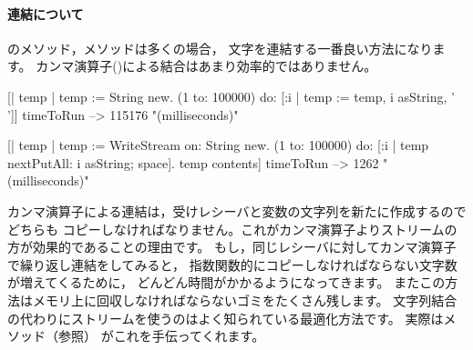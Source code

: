 \documentclass[a4paper,10pt,twoside]{book}
\begin{document}
{\paragraph{連結について}

のメソッド，メソッドは多くの場合，
文字を連結する一番良い方法になります。
カンマ演算子(\ct{,})による結合はあまり効率的ではありません。


\begin{code}{}
[| temp |
  temp := String new.
  (1 to: 100000)
    do: [:i | temp := temp, i asString, ' ']] timeToRun --> 115176 "(milliseconds)"

[| temp |
  temp := WriteStream on: String new.
  (1 to: 100000)
    do: [:i | temp nextPutAll: i asString; space].
  temp contents] timeToRun --> 1262 "(milliseconds)"
\end{code}

カンマ演算子による連結は，受けレシーバと変数の文字列を新たに作成するのでどちらも
コピーしなければなりません。これがカンマ演算子よりストリームの方が効果的であることの理由です。
もし，同じレシーバに対してカンマ演算子で繰り返し連結をしてみると，
指数関数的にコピーしなければならない文字数が増えてくるために，
どんどん時間がかかるようになってきます。
またこの方法はメモリ上に回収しなければならないゴミをたくさん残します。
文字列結合の代わりにストリームを使うのはよく知られている最適化方法です。
実際はメソッド（\pageref{sec:streamContents}参照）
がこれを手伝ってくれます。


}
\end{document}
